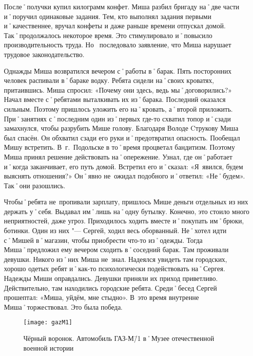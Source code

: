 После˚получки купил килограмм конфет. Миша разбил бригаду на˚две части и˚поручил одинаковые задания. Тем, кто выполнял задания первыми и˚качественнее, вручал конфеты и даже раньше времени отпускал домой. Так˚продолжалось некоторое время. Это стимулировало и˚повысило производительность труда. Но~ последовало заявление, что Миша нарушает трудовое законодательство.

Однажды Миша возвратился вечером с˚работы в˚барак. Пять посторонних человек распивали в˚бараке водку. Ребята сидели на˚своих кроватях, притаившись. Миша спросил: «Почему они здесь, ведь мы˚договорились?» Начал вместе с˚ребятами выталкивать их из˚барака. Последний оказался сильным. Поэтому пришлось уложить его на˚кровать, а˚второй приложить. При˚занятиях с˚последним один из˚первых где-то схватил топор и˚сзади замахнулся, чтобы разрубить Мише голову. Благодаря Володе Cтрукову Миша был спасён. Он обхватил сзади его руки и˚предотвратил опасность. Пообещал Мишу встретить. В~г.~Подольске в то˚время процветал бандитизм. Поэтому Миша принял решение действовать на˚опережение. Узнал, где он˚работает и˚когда заканчивает, его путь домой. Встретил его и˚сказал: «Я~явился, будем выяснять отношения?» Он˚явно не~ожидал подобного и˚ответил: «Не˚будем». Так˚они разошлись.

Чтобы˚ребята не~пропивали зарплату, пришлось Мише деньги отдельных из них держать у˚себя. Выдавал им˚лишь на˚одну бутылку. Конечно, это стоило много неприятностей, даже угроз. Приходилось ходить вместе и˚покупать им˚брюки, ботинки. Один из них "--- Сергей, ходил весь оборванный. Не˚хотел идти с˚Мишей в˚магазин, чтобы приобрести что-то из˚одежды. Тогда Миша˚предложил ему вечером сходить в˚соседний барак. Там проживали девушки. Никого из˚них Миша не~знал. Надеялся увидеть там городских, хорошо одетых ребят и˚как-то психологически подействовать на˚Сергея. Надежды Миши оправдались. Девушки приняли их приход приветливо. Действительно, там находились городские ребята. Среди˚бесед Сергей прошептал: «Миша, уйдём, мне стыдно». В~это время внутренне Миша˚торжествовал. Это была победа.

\begin{wrapfigure}{O}{.4\textwidth}
\centering
\texttt{[image: gazM1]}
\caption[Чёрный воронок. Автомобиль ГАЗ-М\=/1 в˚Музее отечественной военной истории]{Чёрный воронок. Автомобиль ГАЗ-М\=/1 в˚Музее отечественной военной истории\footnotemark}
\label{fig:gazM1}
\end{wrapfigure}

